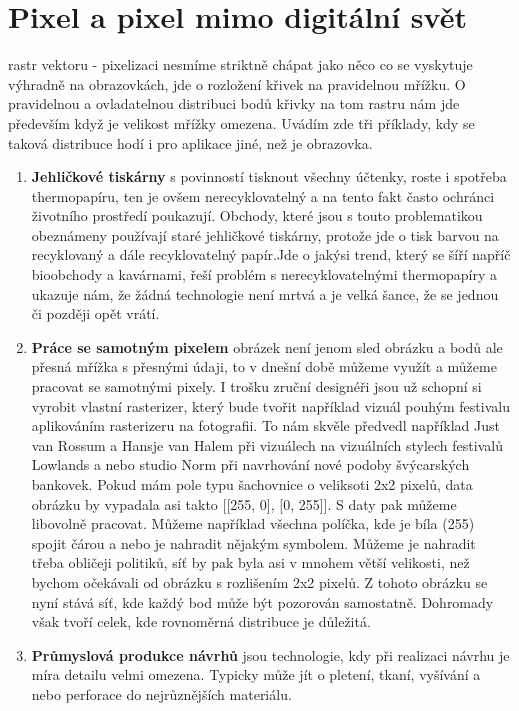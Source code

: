 \documentclass[a4paper]{article}
\begin{document}
\section{Pixel a pixel mimo digitální svět}
rastr vektoru - pixelizaci nesmíme striktně chápat jako něco co se vyskytuje výhradně na obrazovkách, jde o rozložení křivek na pravidelnou mřížku. O pravidelnou a ovladatelnou distribuci bodů křivky na tom rastru nám jde především když je velikost mřížky omezena. Uvádím zde tři příklady, kdy se taková distribuce hodí i pro aplikace jiné, než je obrazovka.\\

\begin{enumerate}
\item \textbf{Jehličkové tiskárny} s povinností tisknout všechny účtenky, roste i spotřeba thermopapíru, ten je ovšem nerecyklovatelný a na tento fakt často ochránci životního prostředí poukazují. Obchody, které jsou s touto problematikou obeznámeny používají staré jehličkové tiskárny, protože jde o tisk barvou na recyklovaný a dále recyklovatelný papír.Jde o jakýsi trend, který se šíří napříč bioobchody a kavárnami, řeší problém s nerecyklovatelnými thermopapíry a ukazuje nám, že žádná technologie není mrtvá a je velká šance, že se jednou či později opět vrátí. 

\item \textbf{Práce se samotným pixelem}
obrázek není jenom sled obrázku a bodů ale přesná mřížka s přesnými údaji, to v dnešní době můžeme využít a můžeme pracovat se samotnými pixely. I trošku zruční designéři jsou už schopní si vyrobit vlastní rasterizer, který bude tvořit například vizuál pouhým festivalu aplikováním rasterizeru na fotografii. To nám skvěle předvedl například Just van Rossum a Hansje van Halem při vizuálech na vizuálních stylech festivalů Lowlands a nebo studio Norm při navrhování nové podoby švýcarských bankovek. Pokud mám pole typu šachovnice o veliksoti 2x2 pixelů, data obrázku by vypadala asi takto [[255, 0], [0, 255]]. S daty pak můžeme libovolně pracovat. Můžeme například všechna políčka, kde je bíla (255) spojit čárou a nebo je nahradit nějakým symbolem. Můžeme je nahradit třeba obličeji politiků, síť by pak byla asi v mnohem větší velikosti, než bychom očekávali od obrázku s rozlišením 2x2 pixelů. Z tohoto obrázku se nyní stává síť, kde každý bod může být pozorován samostatně. Dohromady však tvoří celek, kde rovnoměrná distribuce je důležitá.

\item \textbf{Průmyslová produkce návrhů}
jsou technologie, kdy při realizaci návrhu je míra detailu velmi omezena. Typicky může jít o pletení, tkaní, vyšívání a nebo perforace do nejrůznějších materiálu.
\end{enumerate}
\end{document}
